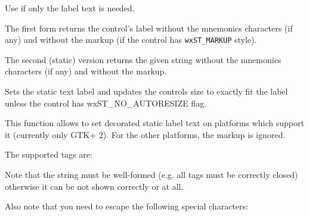 Use  if only the
label text is needed.


\label{wxstatictextgetlabeltext}



The first form returns the control's label without the mnemonics characters (if any) 
and without the markup (if the control has \texttt{wxST\_MARKUP} style).

The second (static) version returns the given  string without the mnemonics 
characters (if any) and without the markup.


\label{wxstatictextsetlabel}


Sets the static text label and updates the controls size to exactly fit the
label unless the control has wxST\_NO\_AUTORESIZE flag.

This function allows to set decorated static label text on platforms which
support it (currently only GTK+ 2). For the other platforms, the markup is
ignored.

The supported tags are:

\twocolwidtha{5cm}
\begin{twocollist}\itemsep=0pt
\end{twocollist}

Note that the string must be well-formed (e.g. all tags must be correctly closed)
otherwise it can be not shown correctly or at all.

Also note that you need to escape the following special characters:

\twocolwidtha{5cm}
\begin{twocollist}\itemsep=0pt
\end{twocollist}


